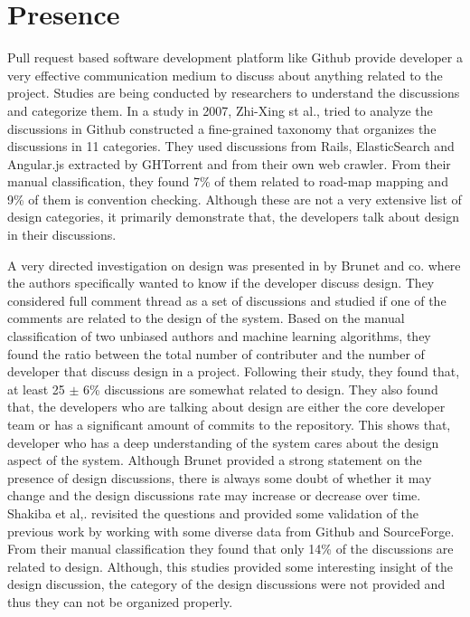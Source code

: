 \section{Presence}
\label{sect:presence}
Pull request based software development platform like Github provide developer a very effective communication medium to discuss about anything related to the project. Studies are being conducted by researchers to understand the discussions and categorize them. In a study in 2007, Zhi-Xing st al.,\cite{Li2007} tried to analyze the discussions in Github constructed a fine-grained taxonomy that organizes the discussions in 11 categories. They used discussions from Rails, ElasticSearch and Angular.js extracted by GHTorrent and from their own web crawler. From their manual classification, they found 7\% of them related to road-map mapping and 9\% of them is convention checking. Although these are not a very extensive list of design categories, it primarily demonstrate that, the developers talk about design in their discussions.

A very directed investigation on design was presented in \cite{Brunet2014a} by Brunet and co. where the authors specifically wanted to know if the developer discuss design. They considered full comment thread as a set of discussions and studied if one of the comments are related to the design of the system. Based on the manual classification of two unbiased authors and machine learning algorithms, they found the ratio between the total number of contributer and the number of developer that discuss design in a project. Following their study, they found that, at least 25 {$\pm$} 6\% discussions are somewhat related to design. They also found that, the developers who are talking about design are either the core developer team or has a significant amount of commits to the repository. This shows that, developer who has a deep understanding of the system cares about the design aspect of the system. Although Brunet\cite{Brunet2014a} provided a strong statement on the presence of design discussions, there is always some doubt of whether it may change and the design discussions rate may increase or decrease over time. Shakiba et al,.\cite{Shakiba2016} revisited the questions and provided some validation of the previous work by working with some diverse data from Github and SourceForge. From their manual classification they found that only 14\% of the discussions are related to design. Although, this studies provided some interesting insight of the design discussion, the category of the design discussions were not provided and thus they can not be organized properly.

